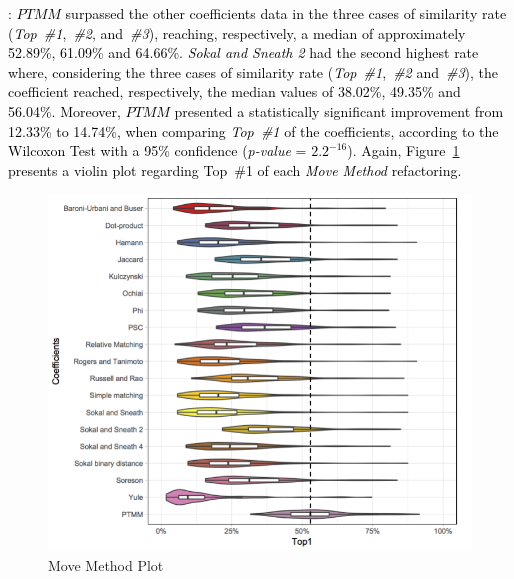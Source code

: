 \documentclass[smallextended,natbib]{svjour3}
\begin{document}
{: \textcolor{black}{$PTMM$ surpassed the other coefficients data in the three cases of similarity rate (\textit{Top~\#1},~\textit{\#2}, and~\textit{\#3}), reaching, respectively, a median of approximately 52.89\%, 61.09\% and 64.66\%. \textit{Sokal and Sneath 2} had the second highest rate where, considering the three cases of similarity rate (\textit{Top~\#1},~\textit{\#2} and~\textit{\#3}), the coefficient reached, respectively, the median values of 38.02\%, 49.35\% and 56.04\%.} %
\textcolor{black}{Moreover, $PTMM$ presented a statistically significant improvement from 12.33\% to 14.74\%, when comparing \textit{Top~\#1} of the coefficients, according to the Wilcoxon Test with a 95\% confidence (\textit{p-value} = ${2.2}^{-16}$)}. %
\textcolor{black}{Again, Figure~\ref{fig:graph3} presents a violin plot regarding Top~\#1 of each \textit{Move Method} refactoring.}\\[-0.2cm]

\begin{figure}[ht]
\centering
\includegraphics[scale=0.36]{MM.png}
\vspace{-5pt}
\caption{Move Method Plot}
\label{fig:graph3}
\end{figure}

}
\end{document}
